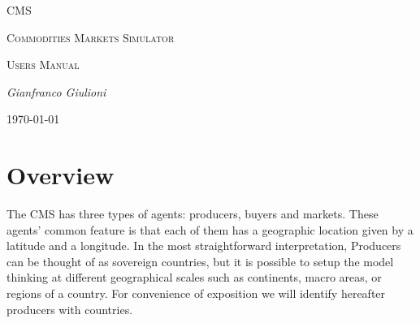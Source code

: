 \documentclass{article}
\begin{document}
\begin{titlepage}

	\begin{center}
	{\color{blue}\scshape\Huge CMS \par}
	\end{center}

	\vspace{2cm}

	\noindent
	{\color{blue}\scshape\Huge C}{\scshape\LARGE ommodities} 
	{\color{blue}\scshape\Huge M}{\scshape\LARGE arkets} 
	{\color{blue}\scshape\Huge S}{\scshape\LARGE imulator}\\

 
	
	\vspace{1.5cm}
	\noindent
	{\scshape\Huge Users Manual \par}

	\vspace{2cm}
	\noindent
	{\Large\itshape Gianfranco Giulioni\par}
	\vfill

	{\large \today\par}
\end{titlepage}

\newpage
\thispagestyle{empty}

\null


\tableofcontents
 

\newpage






\printglossaries

\newpage

\section{Overview}

The CMS has three types of agents: producers, buyers and markets.
These agents' common feature is that each of them has a geographic location given by a latitude and a longitude. 
In the most straightforward interpretation, Producers can be thought of as sovereign countries, but it is possible to setup the model thinking at different geographical scales such as continents, macro areas, or regions of a country. For convenience of exposition we will identify hereafter producers with countries.
\end{document}

